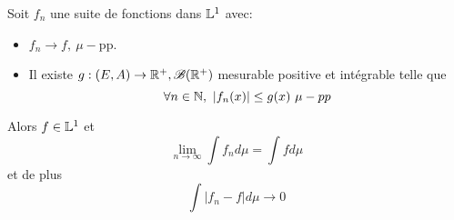 \begin{theorem}
	Soit $f_n$ une suite de fonctions dans $\mathbb{L}^1$ avec:
	\begin{itemize}
		\item $f_n \to f, \ \mu-$pp.
		\item Il existe $g : (E,A) \to \mathbb{R}^+, \mathscr{B}(\mathbb{R}^+)$ mesurable positive et intégrable telle que
		      $$\forall n \in\N,\ |f_n(x)| \leq g(x)\ \mu-pp$$
	\end{itemize}

	Alors $f \in \mathbb{L}^1$ et
	$$\lim_{n\to \infty} \int f_n d\mu= \int f d \mu$$
	et de plus
	$$ \int |f_n - f | d \mu \to 0 $$
\end{theorem}





